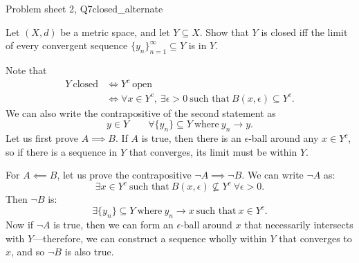 \begin{problem}{Problem sheet 2, Q7}{closed_alternate}


    Let $(X, d)$ be a metric space, and let $Y \subseteq X$. Show that $Y$ is closed iff the limit of every convergent sequence $\{y_n\}_{n=1}^\infty \subseteq Y$ is in $Y$.

    \tcblower

    Note that
        \begin{align*}
            Y \ \text{closed} &\iff Y^c \ \text{open} \\
                &\iff \forall x \in Y^c, \ \exists \epsilon > 0
                \ \text{such that} \ B(x, \epsilon)
                \subseteq Y^c \tag{$A$} .
        \end{align*}
    We can also write the contrapositive of the second statement as
        \begin{equation}
            y \in Y \qquad
            \forall \{y_n\} \subseteq Y
                \ \text{where} \ y_n \to y .  \tag{$B$}
        \end{equation}
    Let us first prove $A \implies B$. If $A$ is true, then there is an $\epsilon$-ball around any $x \in Y^c$, so if there is a sequence in $Y$ that converges, its limit must be within $Y$.

    For $A \impliedby B$, let us prove the contrapositive $\neg A \implies \neg B$. We can write $\neg A$ as:
        \begin{equation}
            \exists x \in Y^c
                \ \text{such that} \ B(x, \epsilon) \not \subseteq Y^c
                \ \forall \epsilon > 0 . \tag{$\neg A$}
        \end{equation}
    Then $\neg B$ is:
        \begin{equation}
            \exists \{y_n\} \subseteq Y \ \text{where} \ y_n \to x
            \ \text{such that} \ x \in Y^c . \tag{$\neg B$}
        \end{equation}
    Now if $\neg A$ is true, then we can form an $\epsilon$-ball around $x$ that necessarily intersects with $Y$---therefore, we can construct a sequence wholly within $Y$ that converges to $x$, and so $\neg B$ is also true.
    
\end{problem}

